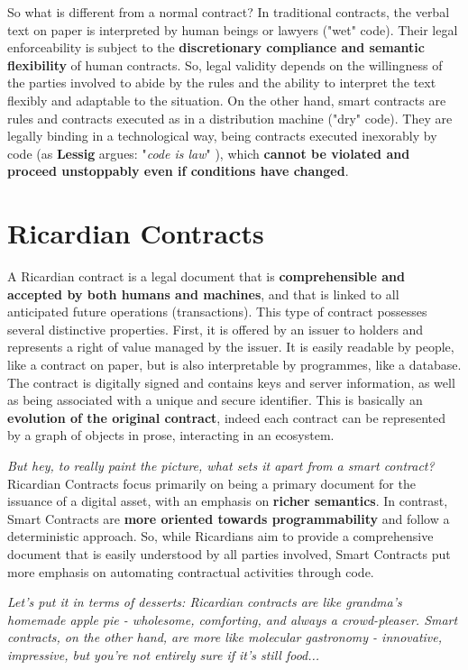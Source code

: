 So what is different from a normal contract? In traditional contracts, the verbal text on paper is interpreted by human beings or lawyers ("wet" code). Their legal enforceability is subject to the \textbf{discretionary compliance and semantic flexibility} of human contracts. So, legal validity depends on the willingness of the parties involved to abide by the rules and the ability to interpret the text flexibly and adaptable to the situation.
On the other hand, smart contracts are rules and contracts executed as in a distribution machine ("dry" code). They are legally binding in a technological way, being contracts executed inexorably by code (as \textbf{Lessig} argues: "\textit{code is law}" \cite{les99}), which \textbf{cannot be violated and proceed unstoppably even if conditions have changed}.

\section{Ricardian Contracts}
A Ricardian contract is a legal document that is \textbf{comprehensible and accepted by both humans and machines}, and that is linked to all anticipated future operations (transactions). This type of contract possesses several distinctive properties. First, it is offered by an issuer to holders and represents a right of value managed by the issuer. It is easily readable by people, like a contract on paper, but is also interpretable by programmes, like a database. The contract is digitally signed and contains keys and server information, as well as being associated with a unique and secure identifier. This is basically an \textbf{evolution of the original contract}, indeed each contract can be represented by a graph of objects in prose, interacting in an ecosystem.

\textit{But hey, to really paint the picture, what sets it apart from a smart contract?} Ricardian Contracts focus primarily on being a primary document for the issuance of a digital asset, with an emphasis on \textbf{richer semantics}. In contrast, Smart Contracts are \textbf{more oriented towards programmability} and follow a deterministic approach. So, while Ricardians aim to provide a comprehensive document that is easily understood by all parties involved, Smart Contracts put more emphasis on automating contractual activities through code.

\textit{Let's put it in terms of desserts: Ricardian contracts are like grandma's homemade apple pie - wholesome, comforting, and always a crowd-pleaser. Smart contracts, on the other hand, are more like molecular gastronomy - innovative, impressive, but you're not entirely sure if it's still food...}

